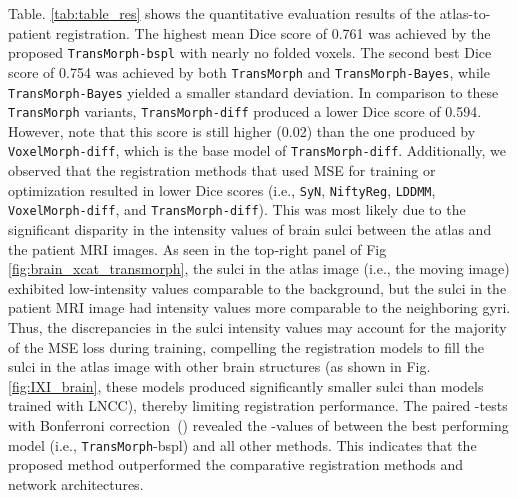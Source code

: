 \documentclass[times,twocolumn,final]{elsarticle}
\begin{document}
Table. \ref{tab:table_res} shows the quantitative evaluation results of the atlas-to-patient registration. The highest mean Dice score of 0.761 was achieved by the proposed \texttt{TransMorph-bspl} with nearly no folded voxels. The second best Dice score of 0.754 was achieved by both \texttt{TransMorph} and \texttt{TransMorph-Bayes}, while \texttt{TransMorph-Bayes} yielded a smaller standard deviation. In comparison to these \texttt{TransMorph} variants, \texttt{TransMorph-diff} produced a lower Dice score of 0.594. However, note that this score is still higher (0.02) than the one produced by \texttt{VoxelMorph-diff}, which is the base model of \texttt{TransMorph-diff}. Additionally, we observed that the registration methods that used MSE for training or optimization resulted in lower Dice scores (i.e., \texttt{SyN}, \texttt{NiftyReg}, \texttt{LDDMM}, \texttt{VoxelMorph-diff}, and \texttt{TransMorph-diff}). This was most likely due to the significant disparity in the intensity values of brain sulci between the atlas and the patient MRI images. As seen in the top-right panel of Fig \ref{fig:brain_xcat_transmorph}, the sulci in the atlas image (i.e., the moving image) exhibited low-intensity values comparable to the background, but the sulci in the patient MRI image had intensity values more comparable to the neighboring gyri. Thus, the discrepancies in the sulci intensity values may account for the majority of the MSE loss during training, compelling the registration models to fill the sulci in the atlas image with other brain structures (as shown in Fig. \ref{fig:IXI_brain}, these models produced significantly smaller sulci than models trained with LNCC), thereby limiting registration performance. The paired -tests with Bonferroni correction~(\cite{armstrong2014use}) revealed the -values of  between the best performing model (i.e., \texttt{TransMorph}-bspl) and all other methods. This indicates that the proposed method outperformed the comparative registration methods and network architectures.
\end{document}
